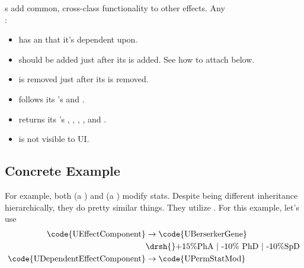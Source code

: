 



s add common, cross-class functionality to other effects. Any \\:

\begin{itemize}
	\item{has an  that it's dependent upon.}
	\item{should be added just after its  is added. See how to attach below.}
	\item{is removed just after its  is removed.}
	\item{follows its 's  and .}
	\item{returns its 's , , , , and .}
	\item{is not visible to UI.}
\end{itemize}

\subsection{Concrete Example}

For example, both  (a ) and  (a ) modify stats. Despite being different inheritance hierarchically, they do pretty similar things. They utilize . For this example, let's use
\begin{align*}
	\text{\code{UEffectComponent}} &\rightarrow \textrm{\code{UBerserkerGene}}\\
		&\drsh{}\textrm{+15\%PhA $|$ -10\% PhD $|$ -10\%SpD}\\
	\text{\code{UDependentEffectComponent}} &\rightarrow \text{\code{UPermStatMod}}
\end{align*}


